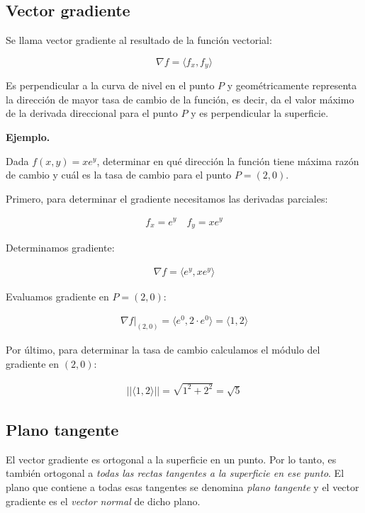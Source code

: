 \subsection{Vector gradiente}

Se llama vector gradiente al resultado de la función vectorial:

\begin{equation*}
    \nabla f = \langle f_x, f_y \rangle
\end{equation*}

Es perpendicular a la curva de nivel en el punto \(P\) 
y geométricamente representa la dirección de mayor tasa de cambio de la función,
es decir,
da el valor máximo de la derivada direccional para el punto \(P\) 
y es perpendicular la superficie.

\vspace{.5cm}
\textbf{Ejemplo.}

Dada \(f(x,y)=xe^{y}\), 
determinar en qué dirección la función tiene máxima razón de cambio
y cuál es la tasa de cambio para el punto \(P = (2,0)\).

Primero,
para determinar el gradiente necesitamos las derivadas parciales:

\begin{align*}
    f_x = e^{y} \quad f_y = xe^{y}
\end{align*}

Determinamos gradiente:

\begin{align*}
    \nabla f = \langle e^{y}, xe^{y} \rangle
\end{align*}

Evaluamos gradiente en \(P = (2,0)\):

\begin{align*}
    \nabla f|_{(2,0)} = \langle e^{0}, 2\cdot e^{0} \rangle = \langle1,2\rangle
\end{align*}

Por último,
para determinar la tasa de cambio calculamos el módulo del gradiente en \((2,0)\):

\begin{align*}
    ||\langle1,2\rangle|| = \sqrt{1^{2} + 2^{2}} = \boxed{\sqrt{5}}
\end{align*}

\subsection{Plano tangente}

El vector gradiente es ortogonal a la superficie en un punto.
Por lo tanto,
es también ortogonal a \textit{todas las rectas tangentes a la superficie en 
ese punto}. 
El plano que contiene a todas esas tangentes se denomina \textit{plano tangente}
y el vector gradiente es el \textit{vector normal} de dicho plano.

